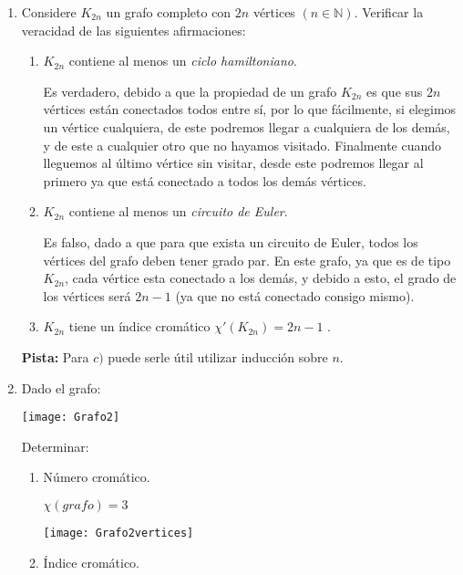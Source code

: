 \documentclass[spanish, fleqn]{article}
\title{Estructuras Discretas \\
       Tarea \#\num \\
       $``$\textit{Don Grafo ataca!}$"$}
\author{Andrés Navarro \\ 201673001-K}
\date{}
\begin{document}
\maketitle
\thispagestyle{empty}

\begin{enumerate}

\item Considere \(K_{2n} \) un grafo completo con \(2n\) vértices \((n\in \mathbb{N} )\). Verificar la veracidad de las siguientes afirmaciones:
\begin{enumerate}
\item \(K_{2n}\) contiene al menos un \textit{ciclo hamiltoniano}.

Es verdadero, debido a que la propiedad de un grafo $K_{2n}$ es que sus $2n$ vértices están conectados todos entre sí, por lo que fácilmente, si elegimos un vértice cualquiera, de este podremos llegar a cualquiera de los demás, y de este a cualquier otro que no hayamos visitado. Finalmente cuando lleguemos al último vértice sin visitar, desde este podremos llegar al primero ya que está conectado a todos los demás vértices.
 
\item \(K_{2n}\) contiene al menos un \textit{circuito de Euler}.

Es falso, dado a que para que exista un circuito de Euler, todos los vértices del grafo deben tener grado par. En este grafo, ya que es de tipo $K_{2n}$, cada vértice esta conectado a los demás, y debido a esto, el grado de los vértices será $2n-1$ (ya que no está conectado consigo mismo).

\item \(K_{2n}\) tiene un índice cromático \( \chi'(K_{2n}) = 2n - 1 \) .


\end{enumerate}

\textbf{Pista:} Para \( c) \) puede serle útil utilizar inducción sobre \(n\).

\item Dado el grafo:
\begin{center}
\texttt{[image: Grafo2]}
\end{center}
Determinar: 
\begin{enumerate}
\item{Número cromático.}

$\chi(grafo) = 3$

\texttt{[image: Grafo2vertices]}

\item{Índice cromático.}


\end{enumerate}
\end{enumerate}
\end{document}
